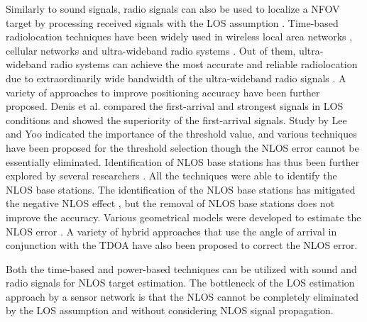 \documentclass[letterpaper, 10 pt, conference]{ieeeconf}  %
\begin{document}
Similarly to sound signals, radio signals can also be used to localize a NFOV target by processing received signals with the LOS assumption \cite{Bertinato2008,Dai2012,Ni2004,Zhang2010,Liu2007,Gezici2008,Guvenc2009}.  Time-based  radiolocation techniques have been widely used in wireless local area networks \cite{sayed2005network, sun2005signal}, cellular networks \cite{caffery2000new,venkatraman2004novel,wei2005new} and ultra-wideband radio systems \cite{correal2003uwb,fleming1995low,gezici2005localization}. Out of them, ultra-wideband radio systems can achieve the most accurate and reliable radiolocation due to extraordinarily wide bandwidth of the ultra-wideband radio signals \cite{correal2003uwb,fleming1995low,fontana2002ultra,gezici2005localization,patwari2005locating}.  A variety of approaches to improve positioning accuracy have been further proposed. Denis et al. \cite{denis2003impact} compared the first-arrival and strongest signals in LOS conditions and showed the superiority of the first-arrival signals.  Study by Lee and Yoo \cite{lee2006large} indicated  the importance of the threshold value, and various techniques have been proposed for the threshold selection \cite{low2005pulse,irahhauten2006investigation,xu2008delay,guvenc2007joint} though the NLOS error cannot be essentially eliminated.  Identification of NLOS base stations has thus been further explored by several researchers \cite{borras1998decision,venkatraman2002statistical,chen1999non,cong2001non,cong2005nonline,heidari2008identification}. All the techniques were able to identify the NLOS base stations. The identification of the NLOS base stations has mitigated the negative NLOS effect \cite{cong2005nonline,chen1999non,cong2001non}, but the removal of NLOS base stations does not improve the accuracy.  Various geometrical models were developed to  estimate  the  NLOS error \cite{foy1976position,wang2003toa,venkatraman2004novel,al2002ml,lin2007mobile,schmidt1972new,murphy1995determination,caffery2000new,chan1994simple,wei2005new,yu2008improved,gill1981practical}.  A variety of hybrid approaches \cite{cong2002hybrid, li2006mobile, miao2007positioning, seow2008non, Seow2008, thomas2001calculation, venkatraman2004hybrid} that use the angle of arrival in conjunction with the TDOA have also been proposed to correct the NLOS error.  

Both the time-based and power-based techniques can be utilized with sound and radio signals for NLOS target estimation.  The bottleneck of the LOS estimation approach by a sensor network is that the NLOS cannot be completely eliminated by the LOS assumption and without considering NLOS signal propagation.  
\end{document}
